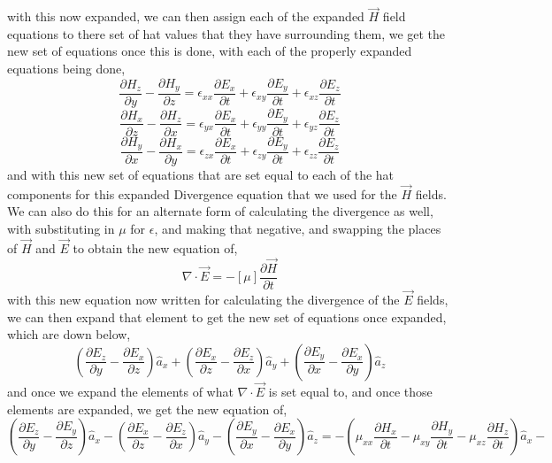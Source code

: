 \documentclass[]{article}
\begin{document}
with this now expanded, we can then assign each of the expanded $\vec{H}$ field equations to there set of hat values that they have surrounding them, we get the new set of equations once this is done, with each of the properly expanded equations being done,
\begin{equation}
\frac{\partial{H}_z}{\partial{y}} - \frac{\partial{H}_y}{\partial{z}} = \epsilon_{xx}\frac{\partial{E}_x}{\partial{t}} + \epsilon_{xy}\frac{\partial{E}_y}{\partial{t}} + \epsilon_{xz}\frac{\partial{E}_z}{\partial{t}} 
\end{equation}
\begin{equation}
\frac{\partial{H}_x}{\partial{z}} - \frac{\partial{H}_z}{\partial{x}} = \epsilon_{yx}\frac{\partial{E}_x}{\partial{t}} + \epsilon_{yy}\frac{\partial{E}_y}{\partial{t}} + \epsilon_{yz}\frac{\partial{E}_z}{\partial{t}} 
\end{equation}
\begin{equation}
\frac{\partial{H}_y}{\partial{x}} - \frac{\partial{H}_x}{\partial{y}} = \epsilon_{zx}\frac{\partial{E}_x}{\partial{t}} + \epsilon_{zy}\frac{\partial{E}_y}{\partial{t}} + \epsilon_{zz}\frac{\partial{E}_z}{\partial{t}}
\end{equation}
and with this new set of equations that are set equal to each of the hat components for this expanded Divergence equation that we used for the $\vec{H}$ fields. We can also do this for an alternate form of calculating the divergence as well, with substituting in $\mu$ for $\epsilon$, and making that negative, and swapping the places of $\vec{H}$ and $\vec{E}$ to obtain the new equation of,
\begin{equation}
\nabla \cdot \vec{E} = -[\mu] \frac{\partial{\vec{H}}}{\partial{t}}
\end{equation}
with this new equation now written for calculating the divergence of the $\vec{E}$ fields, we can then expand that element to get the new set of equations once expanded, which are down below,
\begin{equation}
{(\frac{\partial{E}_z}{\partial{y}} - \frac{\partial{E}_x}{\partial{z}})\hat{a}_x + (\frac{\partial{E}_x}{\partial{z}} - \frac{\partial{E}_z}{\partial{x}})\hat{a}_y + (\frac{\partial{E}_y}{\partial{x}} - \frac{\partial{E}_x}{\partial{y}})\hat{a}_z}
\end{equation}
and once we expand the elements of what $\nabla \cdot \vec{E}$ is set equal to, and once those elements are expanded, we get the new equation of,
\[(\frac{\partial{E}_z}{\partial{y}} - \frac{\partial{E}_y}{\partial{z}})\hat{a}_x - (\frac{\partial{E}_x}{\partial{z}} - \frac{\partial{E}_z}{\partial{x}})\hat{a}_y - (\frac{\partial{E}_y}{\partial{x}} - \frac{\partial{E}_x}{\partial{y}})\hat{a}_z = 
-(\mu_{xx}\frac{\partial{H}_x}{\partial{t}} - \mu_{xy}\frac{\partial{H}_y}{\partial{t}} - \mu_{xz}\frac{\partial{H}_z}{\partial{t}})\hat{a}_x -\]
\end{document}
